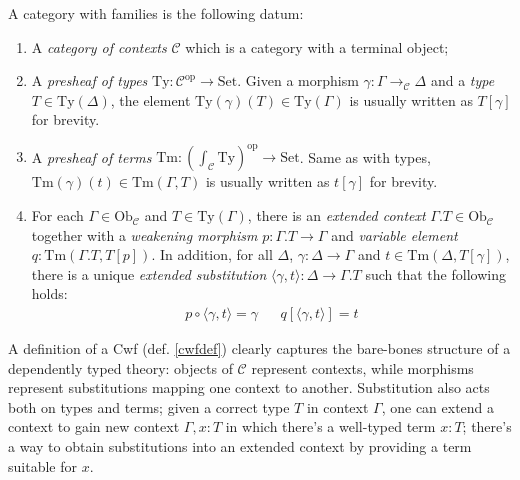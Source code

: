\begin{definition}
    \label{cwfdef}
    A category with families is the following datum:
    \begin{enumerate}
        \item A \textit{category of contexts}
            $\mathcal{C}$ which is a category with a
            terminal object;
        \item A \textit{presheaf of types}
            $\mathrm{Ty}:\mathcal{C}^\mathrm{op}\to
            \mathrm{Set}$. Given a morphism $\gamma:
            \Gamma\to_\mathcal{C}\Delta$ and a
            \textit{type} $T\in\mathrm{Ty}(\Delta)$,
            the element $\mathrm{Ty}(\gamma)(T)\in
            \mathrm{Ty}(\Gamma)$ is usually written as
            $T[\gamma]$ for brevity.
        \item A \textit{presheaf of terms}
            $\mathrm{Tm}:\left(\int_\mathcal{C}
            \mathrm{Ty}\right)^\mathrm{op}\to
            \mathrm{Set}$. Same as with types,
            $\mathrm{Tm}(\gamma)(t)\in\mathrm{Tm}(
            \Gamma, T)$ is usually written as
            $t[\gamma]$ for brevity.
        \item For each
            $\Gamma\in\mathrm{Ob}_\mathcal{C}$ and
            $T\in\mathrm{Ty}(\Gamma)$, there is an
            \textit{extended context} $\Gamma.T\in
            \mathrm{Ob}_\mathcal{C}$ together with a
            \textit{weakening morphism} $p:\Gamma.T\to
            \Gamma$ and \textit{variable element}
            $q:\mathrm{Tm}(\Gamma.T, T[p])$. In
            addition, for all $\Delta$, $\gamma:\Delta
            \to\Gamma$ and $t\in\mathrm{Tm}(\Delta,
            T[\gamma])$, there is a unique
            \textit{extended substitution} $\langle
            \gamma,t\rangle:\Delta\to\Gamma.T$ such
            that the following holds:
            \begin{align*}
                p\circ\langle\gamma,t\rangle=\gamma & &
                q[\langle \gamma, t \rangle] = t
            \end{align*}
\end{enumerate}
\end{definition}

A definition of a Cwf (def. \ref{cwfdef}) clearly
captures the bare-bones structure of a dependently
typed theory: objects of $\mathcal{C}$ represent
contexts, while morphisms represent substitutions
mapping one context to another. Substitution also acts
both on types and terms; given a correct type $T$ in
context $\Gamma$, one can extend a context to gain new
context $\Gamma,x:T$ in which there's a well-typed term
$x:T$; there's a way to obtain substitutions into an
extended context by providing a term suitable for $x$.

